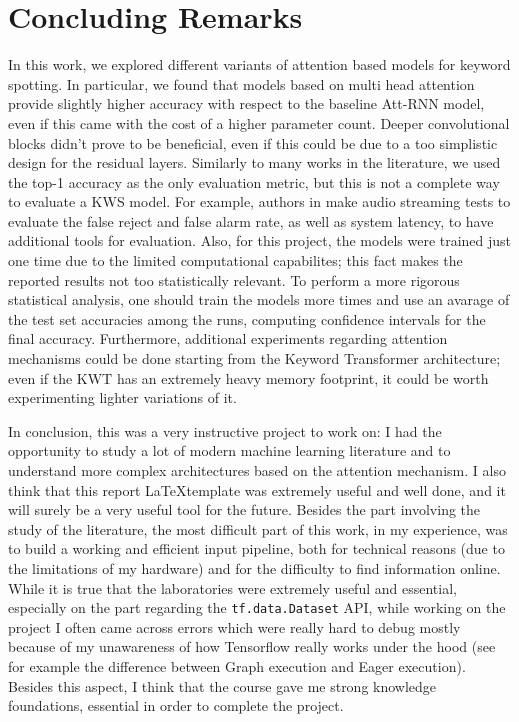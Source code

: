 
\section{Concluding Remarks}

In this work, we explored different variants of attention based models for keyword spotting. In particular, we found that models based on multi head attention provide slightly higher accuracy with respect to the baseline Att-RNN  model, even if this came with the cost of a higher parameter count. Deeper convolutional blocks didn't prove to be beneficial, even if this could be due to a too simplistic design for the residual layers. Similarly to many works in the literature, we used the top-1 accuracy as the only evaluation metric, but this is not a complete way to evaluate a KWS model. For example, authors in \cite{dnns2014chen}\cite{convnns2015sainath}\cite{streamingkws2020Rybakov} make audio streaming tests to evaluate the false reject and false alarm rate, as well as system latency, to have additional tools for evaluation. Also, for this project, the models were trained just one time due to the limited computational capabilites; this fact makes the reported results not too statistically relevant. To perform a more rigorous statistical analysis, one should train the models more times and use an avarage of the test set accuracies among the runs, computing confidence intervals for the final accuracy. Furthermore, additional experiments regarding attention mechanisms could be done starting from the Keyword Transformer architecture; even if the KWT has an extremely heavy memory footprint, it could be worth experimenting lighter variations of it.

In conclusion, this was a very instructive project to work on: I had the opportunity to study a lot of modern machine learning literature and to understand more complex architectures based on the attention mechanism. I also think that this report \LaTeX template was extremely useful and well done, and it will surely be a very useful tool for the future. Besides the part involving the study of the literature, the most difficult part of this work, in my experience, was to build a working and efficient input pipeline, both for technical reasons (due to the limitations of my hardware) and for the difficulty to find information online. While it is true that the laboratories were extremely useful and essential, especially on the part regarding the \verb|tf.data.Dataset| API, while working on the project I often came across errors which were really hard to debug mostly because of my unawareness of how Tensorflow really works under the hood (see for example the difference between Graph execution and Eager execution). Besides this aspect, I think that the course gave me strong knowledge foundations, essential in order to complete the project.

